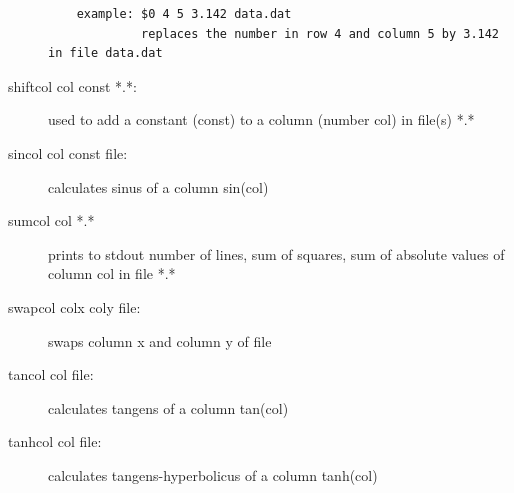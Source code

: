 \begin{description}
\begin{verbatim}
    example: $0 4 5 3.142 data.dat
             replaces the number in row 4 and column 5 by 3.142 in file data.dat
\end{verbatim}
\item [\prg shiftcol\index{shiftcol}\label{shiftcol} col const *.*:] used to add a constant (const) to a column %
(number col) in file(s) *.*
\item [\prg sincol\index{sincol}\label{sincol} col const file:] calculates sinus of a column sin(col) 
\item [\prg sumcol\index{sumcol}\label{sumcol} col *.*] prints to stdout number of lines, sum of squares, sum %
of absolute values of column col in file *.*
\item [\prg swapcol\index{swapcol}\label{swapcol} colx coly file:] swaps column x and column y of file
\item [\prg tancol\index{tancol}\label{tancol} col file:] calculates tangens of a column tan(col)
\item [\prg tanhcol\index{tanhcol}\label{tanhcol} col file:] calculates tangens-hyperbolicus of a column tanh(col)

\end{description}
